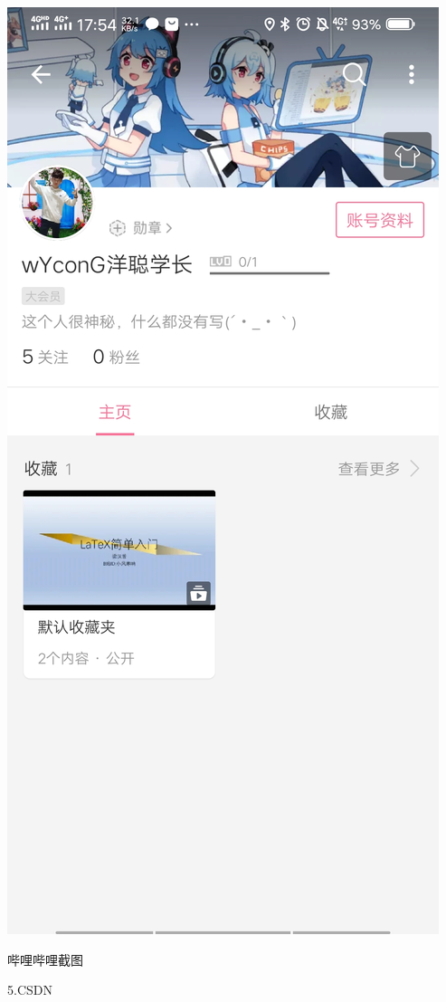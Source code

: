 \documentclass{article}
\begin{document}
\makeatother
\includegraphics[scale=0.1]{bilibili}
\caption{哔哩哔哩截图}
\label{fig:bilibili}
5.CSDN

\makeatletter

\def\@captype{figure}
\end{document}
